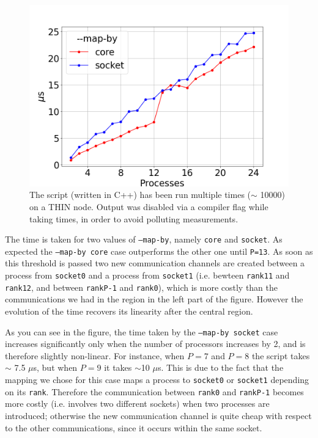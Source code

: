 \documentclass{article}
\begin{document}
\begin{figure}[t]
    \centering
    \includegraphics[width=\textwidth]{ring/fig.png}
    \caption{The script (written in C++) has been run multiple times ($\sim$ 10000) on a THIN node. Output was disabled via a compiler flag while taking times, in order to avoid polluting measurements.}
    \label{fig:ring_performance}
\end{figure}

The time is taken for two values of \texttt{--map-by}, namely \texttt{core} and \texttt{socket}. As expected the \texttt{--map-by core} case outperforms the other one until \texttt{P=13}. As soon as this threshold is passed two new communication channels are created between a process from \texttt{socket0} and a process from \texttt{socket1} (i.e. bewteen \texttt{rank11} and \texttt{rank12}, and between \texttt{rankP-1} and \texttt{rank0}), which is more costly than the communications we had in the region in the left part of the figure. However the evolution of the time recovers its linearity after the central region.

As you can see in the figure, the time taken by the \texttt{--map-by socket} case increases significantly only when the number of processors increases by 2, and is therefore slightly non-linear. For instance, when $P=7$ and $P=8$ the script takes $\sim$ 7.5 $\mu$s, but when $P=9$ it takes $\sim$10 $\mu$s. This is due to the fact that the mapping we chose for this case maps a process to \texttt{socket0} or \texttt{socket1} depending on its \texttt{rank}. Therefore the communication between \texttt{rank0} and \texttt{rankP-1} becomes more costly (i.e. involves two different sockets) when two processes are introduced; otherwise the new communication channel is quite cheap with respect to the other communications, since it occurs within the same socket.
\end{document}
